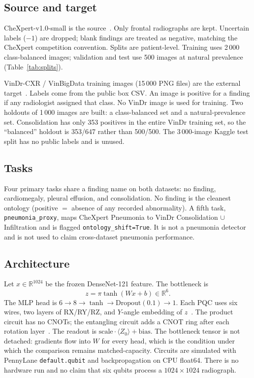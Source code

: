 \documentclass[11pt,a4paper]{article}
\begin{document}
\subsection{Source and target}

CheXpert-v1.0-small is the source~\citep{irvin2019chexpert}. Only frontal radiographs are kept. Uncertain labels ($-1$) are dropped; blank findings are treated as negative, matching the CheXpert competition convention. Splits are patient-level. Training uses 2\,000 class-balanced images; validation and test use 500 images at natural prevalence (Table~\ref{tab:splits}).

VinDr-CXR / VinBigData training images (15\,000 PNG files) are the external target~\citep{nguyen2022vindrcxr}. Labels come from the public box CSV. An image is positive for a finding if any radiologist assigned that class. No VinDr image is used for training. Two holdouts of 1\,000 images are built: a class-balanced set and a natural-prevalence set. Consolidation has only 353 positives in the entire VinDr training set, so the ``balanced'' holdout is 353/647 rather than 500/500. The 3\,000-image Kaggle test split has no public labels and is unused.

\subsection{Tasks}

Four primary tasks share a finding name on both datasets: no finding, cardiomegaly, pleural effusion, and consolidation. No finding is the cleanest ontology (positive $=$ absence of any recorded abnormality). A fifth task, \texttt{pneumonia\_proxy}, maps CheXpert Pneumonia to VinDr Consolidation $\cup$ Infiltration and is flagged \texttt{ontology\_shift=True}. It is not a pneumonia detector and is not used to claim cross-dataset pneumonia performance.

\subsection{Architecture}

Let $x \in \mathbb{R}^{1024}$ be the frozen DenseNet-121 feature. The bottleneck is
\begin{equation}
z = \pi \tanh(Wx + b) \in \mathbb{R}^{6}.
\end{equation}
The MLP head is $6 \to 8 \to \tanh \to \mathrm{Dropout}(0.1) \to 1$. Each PQC uses six wires, two layers of RX/RY/RZ, and $Y$-angle embedding of $z$~\citep{schuld2021encoding,bergholm2018pennylane}. The product circuit has no CNOTs; the entangling circuit adds a CNOT ring after each rotation layer~\citep{sim2019expressibility}. The readout is $\mathrm{scale}\cdot\langle Z_0\rangle + \mathrm{bias}$. The bottleneck tensor is not detached: gradients flow into $W$ for every head, which is the condition under which the comparison remains matched-capacity. Circuits are simulated with PennyLane \texttt{default.qubit} and backpropagation on CPU float64. There is no hardware run and no claim that six qubits process a $1024\times 1024$ radiograph.
\end{document}
